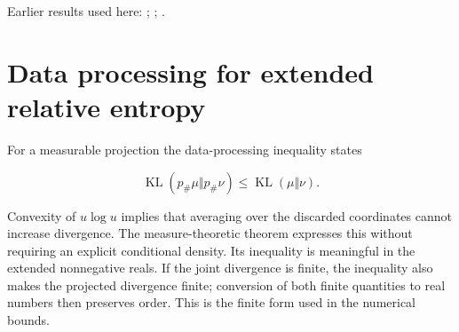 \documentclass[11pt,a4paper]{article}
\begin{document}
Earlier results used here: \cite[Section~3.1.1]{LangevinLean2026IPLA}; \cite[Section~3.1.6]{LangevinLean2026IPLA}; \cite[Section~3.3.2]{LangevinLean2026IPLA}.

\section{\texorpdfstring{Data processing for extended relative entropy}{Data processing for extended relative entropy}}


For a measurable projection the data-processing inequality states

\[\operatorname{KL}(p_\#\mu\Vert p_\#\nu)\le\operatorname{KL}(\mu\Vert\nu).\]

Convexity of \(u\log u\) implies that averaging over the discarded coordinates cannot increase divergence. The measure-theoretic theorem expresses this without requiring an explicit conditional density. Its inequality is meaningful in the extended nonnegative reals. If the joint divergence is finite, the inequality also makes the projected divergence finite; conversion of both finite quantities to real numbers then preserves order. This is the finite form used in the numerical bounds.
\end{document}
